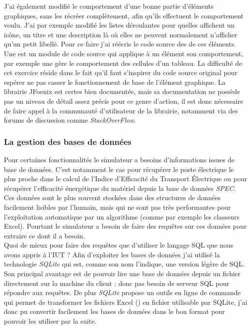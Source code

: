 J'ai également modifié le comportement d'une bonne partie d'éléments graphiques, sans les récréer complètement, afin qu'ils effectuent le comportement voulu. J'ai par exemple modifié les listes déroulantes pour quelles affichent un icône, un titre et une description là où elles ne peuvent normalement n'afficher qu'un petit libellé. Pour ce faire j'ai réécris le code source des  de ces éléments. Une  est un module de code source qui applique à un élément son comportement, par exemple une  gère le comportement des cellules d'un tableau. La difficulté de cet exercice réside dans le fait qu'il faut s'inspirer du code source original pour espérer ne pas casser le fonctionnement de base de l'élément graphique. La librairie JFoenix est certes bien documentée, mais sa documentation ne possède pas un niveau de détail assez précis pour ce genre d'action, il est donc nécessaire de faire appel à la communauté d'utilisateur de la librairie, notamment via des forums de discussion comme \emph{StackOverFlow}.

\subsubsection{La gestion des bases de données}
Pour certaines fonctionnalités le simulateur a besoins d'informations issues de base de données. C'est notamment le cas pour récupérer le poste électrique le plus proche dans le calcul de l'Indice d'Efficacité du Transport Électrique ou pour récupérer l'efficacité énergétique du matériel depuis la base de données \emph{SPEC}.\\
Ces données sont le plus souvent stockées dans des structures de données facilement lisibles par l'humain, mais qui ne sont pas très performantes pour l'exploitation automatique par un algorithme (comme par exemple les classeurs Excel). Pourtant le simulateur a besoin de faire des requêtes sur ces données pour extraire ce dont il a besoin.\\

Quoi de mieux pour faire des requêtes que d'utiliser le langage SQL que nous avons appris à l'IUT ? Afin d'exploiter les bases de données j'ai utilisé la technologie \emph{SQLite} qui est, comme son nom l'indique, une version légère de SQL. Son principal avantage est de pouvoir lire une base de données depuis un fichier directement sur la machine du client : donc pas besoin de serveur SQL pour répondre aux requêtes. De plus \emph{SQLite} propose un outils en ligne de commande qui permet de transformer les fichiers Excel () en fichier utilisable par SQLite, j'ai donc pu convertir facilement les bases de données dans le bon format pour pouvoir les utiliser par la suite.

